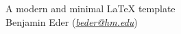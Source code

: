 \documentclass{article}
\makeatletter
\newcommand{\metatitle}{A modern and minimal LaTeX template}
\newcommand{\metaauthor}{Benjamin Eder}
\newcommand{\metaemail}{beder@hm.edu}
\makeatother
\begin{document}
    \begin{center}
        \Huge \metatitle \\[0.6cm]
        \large \metaauthor \hspace{3pt} (\textit{\href{mailto:\metaemail}{\metaemail}}) \\[1.5cm]
    \end{center}

    \tableofcontents %

    

    \printbibliography
\end{document}
